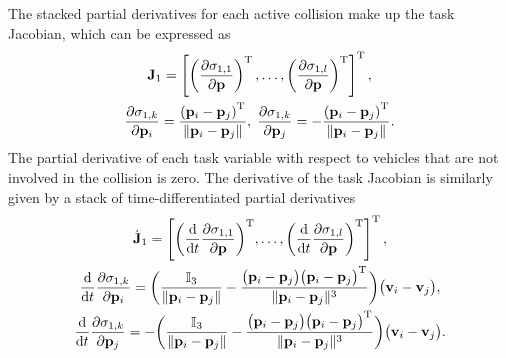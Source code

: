 The stacked partial derivatives for each active collision make up the task Jacobian, which can be expressed as
\begin{subequations}
\begin{gather}
    \mathbf{J}_1 = \left[\left(\frac{\partial \sigma_{1,1}}{\partial \mathbf{p}}\right)^{\rm T}, \ldots, \left(\frac{\partial \sigma_{1,l}}{\partial \mathbf{p}}\right)^{\rm T}\right]^{\rm T},\\
    \frac{\partial \sigma_{1,k}}{\partial \mathbf{p}_i} =\frac{\left(\mathbf{p}_i-\mathbf{p}_j\right) ^{\rm T}}{\|\mathbf{p}_i - \mathbf{p}_j\|}, \; \frac{\partial \sigma_{1,k}}{\partial \mathbf{p}_j} = -\frac{\left(\mathbf{p}_i-\mathbf{p}_j\right) ^{\rm T}}{\|\mathbf{p}_i - \mathbf{p}_j\|}.
\end{gather}
\end{subequations}
The partial derivative of each task variable with respect to vehicles that are not involved in the collision is zero. The derivative of the task Jacobian is similarly given by a stack of time-differentiated partial derivatives
\begin{subequations}
\begin{gather}
    \dot{\mathbf{J}}_1 = \left[{\left(\frac{{\rm d}}{{\rm d}t}\frac{\partial \sigma_{1,1}}{\partial \mathbf{p}}\right)}^{\rm T}, \ldots, {\left(\frac{{\rm d}}{{\rm d}t}\frac{\partial \sigma_{1,l}}{\partial \mathbf{p}}\right)}^{\rm T}\right]^{\rm T},\\
    {\frac{{\rm d}}{{\rm d}t}\frac{\partial \sigma_{1,k}}{\partial \mathbf{p}_i}}= \bigg(\frac{\mathbb{I}_3}{\|\mathbf{p}_i - \mathbf{p}_j\|} - \frac{\bigl(\mathbf{p}_i-\mathbf{p}_j\bigr)\bigl(\mathbf{p}_i-\mathbf{p}_j\bigr)^{\rm T}}{\|\mathbf{p}_i - \mathbf{p}_j\|^3}\bigg)\bigl(\mathbf{v}_i-\mathbf{v}_j\bigr),\\
    {\frac{{\rm d}}{{\rm d}t}\frac{\partial \sigma_{1,k}}{\partial \mathbf{p}_j}}= -\bigg(\frac{\mathbb{I}_3}{\|\mathbf{p}_i - \mathbf{p}_j\|} - \frac{\bigl(\mathbf{p}_i-\mathbf{p}_j\bigr)\bigl(\mathbf{p}_i-\mathbf{p}_j\bigr)^{\rm T}}{\|\mathbf{p}_i - \mathbf{p}_j\|^3}\bigg)\bigl(\mathbf{v}_i-\mathbf{v}_j\bigr).
\end{gather}
\end{subequations}

